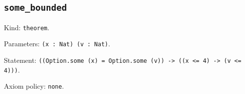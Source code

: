 \documentclass[11pt]{article}
\begin{document}
\subsection*{\texttt{some\_bounded}}
\noindent Kind: \texttt{theorem}.\par
\noindent Parameters: \texttt{(x : Nat) (v : Nat)}.\par
\noindent Statement: \texttt{((Option.some (x) = Option.some (v)) -> ((x <= 4) -> (v <= 4)))}.\par
\noindent Axiom policy: \texttt{none}.\par
\end{document}
